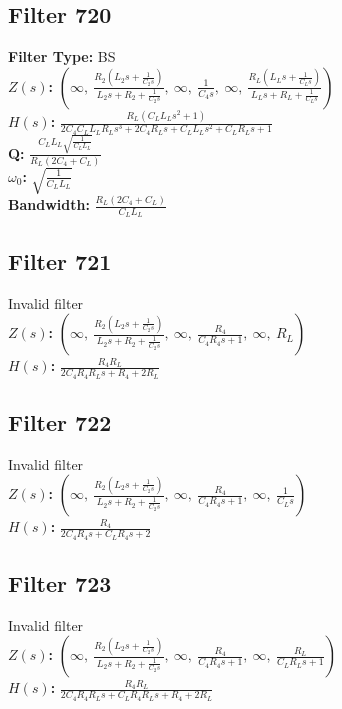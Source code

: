 \documentclass{article}
\begin{document}
\subsection*{Filter 720}
\textbf{Filter Type:} BS \\ 
\textbf{$Z(s)$:} $\left( \infty, \  \frac{R_{2} \left(L_{2} s + \frac{1}{C_{2} s}\right)}{L_{2} s + R_{2} + \frac{1}{C_{2} s}}, \  \infty, \  \frac{1}{C_{4} s}, \  \infty, \  \frac{R_{L} \left(L_{L} s + \frac{1}{C_{L} s}\right)}{L_{L} s + R_{L} + \frac{1}{C_{L} s}}\right)$ \\ 
\textbf{$H(s)$:} $\frac{R_{L} \left(C_{L} L_{L} s^{2} + 1\right)}{2 C_{4} C_{L} L_{L} R_{L} s^{3} + 2 C_{4} R_{L} s + C_{L} L_{L} s^{2} + C_{L} R_{L} s + 1}$ \\ 
\textbf{Q:} $\frac{C_{L} L_{L} \sqrt{\frac{1}{C_{L} L_{L}}}}{R_{L} \left(2 C_{4} + C_{L}\right)}$ \\ 
\textbf{$\omega_0$:} $\sqrt{\frac{1}{C_{L} L_{L}}}$ \\ 
\textbf{Bandwidth:} $\frac{R_{L} \left(2 C_{4} + C_{L}\right)}{C_{L} L_{L}}$ \\ 
\subsection*{Filter 721}
Invalid filter \\ 
\textbf{$Z(s)$:} $\left( \infty, \  \frac{R_{2} \left(L_{2} s + \frac{1}{C_{2} s}\right)}{L_{2} s + R_{2} + \frac{1}{C_{2} s}}, \  \infty, \  \frac{R_{4}}{C_{4} R_{4} s + 1}, \  \infty, \  R_{L}\right)$ \\ 
\textbf{$H(s)$:} $\frac{R_{4} R_{L}}{2 C_{4} R_{4} R_{L} s + R_{4} + 2 R_{L}}$ \\ 
\subsection*{Filter 722}
Invalid filter \\ 
\textbf{$Z(s)$:} $\left( \infty, \  \frac{R_{2} \left(L_{2} s + \frac{1}{C_{2} s}\right)}{L_{2} s + R_{2} + \frac{1}{C_{2} s}}, \  \infty, \  \frac{R_{4}}{C_{4} R_{4} s + 1}, \  \infty, \  \frac{1}{C_{L} s}\right)$ \\ 
\textbf{$H(s)$:} $\frac{R_{4}}{2 C_{4} R_{4} s + C_{L} R_{4} s + 2}$ \\ 
\subsection*{Filter 723}
Invalid filter \\ 
\textbf{$Z(s)$:} $\left( \infty, \  \frac{R_{2} \left(L_{2} s + \frac{1}{C_{2} s}\right)}{L_{2} s + R_{2} + \frac{1}{C_{2} s}}, \  \infty, \  \frac{R_{4}}{C_{4} R_{4} s + 1}, \  \infty, \  \frac{R_{L}}{C_{L} R_{L} s + 1}\right)$ \\ 
\textbf{$H(s)$:} $\frac{R_{4} R_{L}}{2 C_{4} R_{4} R_{L} s + C_{L} R_{4} R_{L} s + R_{4} + 2 R_{L}}$ \\ 
\end{document}
